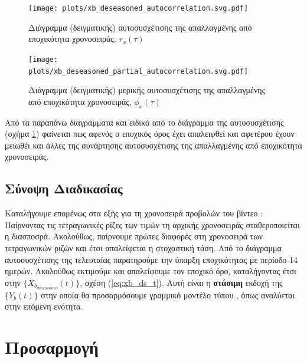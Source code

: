 \begin{figure}[H]
    \begin{center}
        \texttt{[image: plots/xb\_deseasoned\_autocorrelation.svg.pdf]}
        \caption{Διάγραμμα (δειγματικής) αυτοσυσχέτισης της απαλλαγμένης από εποχικότητα χρονοσειράς, $r_x(\tau)$}
        \label{fig:xb_deseasoned_autocorrelation}
    \end{center}
\end{figure}

\begin{figure}[H]
    \begin{center}
        \texttt{[image: plots/xb\_deseasoned\_partial\_autocorrelation.svg.pdf]}
        \caption{Διάγραμμα (δειγματικής) μερικής αυτοσυσχέτισης της απαλλαγμένης από εποχικότητα χρονοσειράς, $\phi_x(\tau)$}
        \label{fig:xb_deseasoned_partial_autocorrelation}
    \end{center}
\end{figure}

Από τα παραπάνω διαγράμματα και ειδικά από το διάγραμμα της αυτοσυσχέτισης (σχήμα \ref{fig:xb_deseasoned_autocorrelation}) φαίνεται πως αφενός ο εποχικός όρος έχει απαλειφθεί και αφετέρου έχουν μειωθέι και άλλες  της συνάρτησης αυτοσυσχέτισης της απαλλαγμένης από εποχικότητα χρονοσειράς. 

\subsection{Σύνοψη Διαδικασίας}

\par Καταλήγουμε επομένως στα εξής για τη χρονοσειρά προβολών του βίντεο :\\
Παίρνοντας τις τετραγωνικές ρίζες των τιμών τη αρχικής χρονοσειράς σταθεροποιείται η διασποσρά. Ακολούθως, παίρνουμε πρώτες διαφορές στη χρονοσειρά των τετραγωνικών ριζών και έτσι απαλείφεται η στοχαστική τάση. Από το διάγραμμα αυτοσυσχέτισης της τελευταίας παρατηρούμε την ύπαρξη εποχικότητας με περίοδο 14 ημερών. Ακολούθως εκτιμούμε και απαλείφουμε τον εποχικό όρο, καταλήγοντας έτσι στην $\{X_{b_{deseasoned}}(t)\}$, σχέση (\ref{eq:xb_ds_t}). Αυτή είναι η \textbf{στάσιμη} εκδοχή της $\{Y_b(t)\}$ στην οποία θα προσαρμόσουμε γραμμικό μοντέλο τύπου , όπως αναλύεται στην επόμενη ενότητα.




\section{Προσαρμογή }

